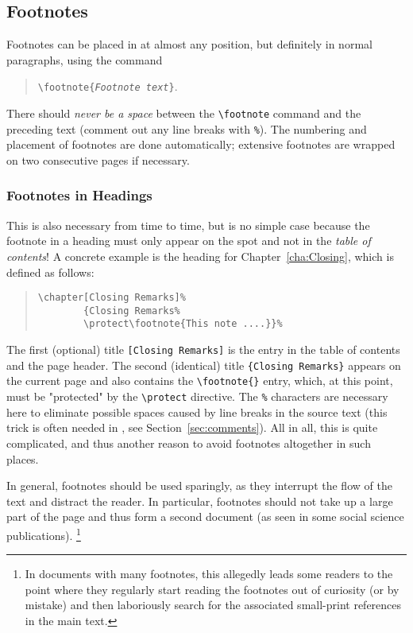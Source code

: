\subsection{Footnotes}

Footnotes can be placed in \latex at almost any position, but definitely in
normal paragraphs, using the command
%
\begin{quote}
    \verb!\footnote{!\texttt{\em Footnote text}\verb!}!.
\end{quote}
%
There should \emph{never be a space} between the \verb!\footnote! command and
the preceding text (comment out any line breaks with \verb!%!). The numbering
and placement of footnotes are done automatically; extensive footnotes are
wrapped on two consecutive pages if necessary.

\subsubsection{Footnotes in Headings}

This is also necessary from time to time, but is no simple case because the
footnote in a heading must only appear on the spot and not in the \emph{table
of contents}! A concrete example is the heading for Chapter~\ref{cha:Closing},
which is defined as follows:
%
\begin{quote}
    \begin{verbatim}
\chapter[Closing Remarks]%
        {Closing Remarks%
        \protect\footnote{This note ....}}%
    \end{verbatim}
\end{quote}
%
The first (optional) title \verb![Closing Remarks]! is the entry in the table of
contents and the page header. The second (identical) title \texttt{\{Closing
Remarks\}} appears on the current page and also contains the \verb!\footnote{}!
entry, which, at this point, must be "protected" by the \verb!\protect!
directive. The \verb!%! characters are necessary here to eliminate possible
spaces caused by line breaks in the source text (this trick is often needed in
\latex, see Section~\ref{sec:comments}). All in all, this is quite complicated,
and thus another reason to avoid footnotes altogether in such places.

In general, footnotes should be used sparingly, as they interrupt the flow of
the text and distract the reader. In particular, footnotes should not take up a
large part of the page and thus form a second document (as seen in some social
science publications).%
\footnote{In documents with many footnotes, this allegedly leads some readers to
the point where they regularly start reading the footnotes out of curiosity (or
by mistake) and then laboriously search for the associated small-print
references in the main text.}

